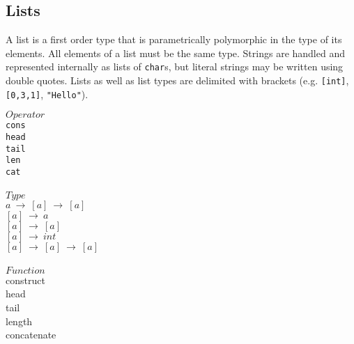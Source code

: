 ﻿\documentclass[5pt]{article}
\begin{document}
\subsection{Lists}
A list is a first order type that is parametrically polymorphic in the type of 
its elements. All elements of a list must be the same type. Strings are handled 
and represented internally as lists of \texttt{char}s, but
literal strings may be written using double quotes. Lists as well as 
list types are delimited with brackets (e.g. \texttt{[int]}, \texttt{[0,3,1]}, \texttt{"Hello"}). 
\begin{multicols}{3}
\noindent $Operator$ \\
\hspace*{5mm} \texttt{cons} \\
\hspace*{5mm} \texttt{head} \\
\hspace*{5mm} \texttt{tail} \\
\hspace*{5mm} \texttt{len} \\
\hspace*{5mm} \texttt{cat} \\
\columnbreak \\
\noindent $Type$ \\
$a \ \rightarrow \ [a] \ \rightarrow \ [a] $ \\
$[a] \ \rightarrow \ a $ \\
$[a] \ \rightarrow \ [a] $ \\
$[a] \ \rightarrow \ int $ \\
$[a] \ \rightarrow \ [a] \ \rightarrow \ [a] $ \\
\columnbreak \\
\noindent $Function$ \\
construct \\
head \\
tail \\
length \\
concatenate \\
\end{multicols}
\end{document}
